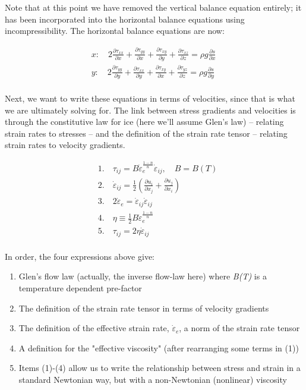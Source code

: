 Note that at this point we have removed the vertical balance equation entirely; it has been incorporated into the horizontal balance equations using incompressibility. The horizontal balance equations are now: 

\begin{align*}
  & x:\quad 2\frac{\partial \tau _{xx}}{\partial x}+\frac{\partial \tau _{yy}}{\partial x}+\frac{\partial \tau _{xy}}{\partial y}+\frac{\partial \tau _{xz}}{\partial z}=\rho g\frac{\partial s}{\partial x}\quad  \\ 
 & y:\quad 2\frac{\partial \tau _{yy}}{\partial y}+\frac{\partial \tau _{xx}}{\partial y}+\frac{\partial \tau _{xy}}{\partial x}+\frac{\partial \tau _{yz}}{\partial z}=\rho g\frac{\partial s}{\partial y} \\ 
\end{align*}

Next, we want to write these equations in terms of velocities, since that is what we are ultimately solving for. The link between stress gradients and velocities is through the constitutive law for ice (here we'll assume Glen's law) -- relating strain rates to stresses -- and the definition of the strain rate tensor -- relating strain rates to velocity gradients.

\begin{align*}
  & 1.\quad \tau _{ij}=B\dot{\varepsilon }_{e}^{\frac{1-n}{n}}\dot{\varepsilon }_{ij},\quad B=B(T) \\ 
 & 2.\quad \dot{\varepsilon }_{ij}=\frac{1}{2}\left( \frac{\partial u_{i}}{\partial x_{j}}+\frac{\partial u_{j}}{\partial x_{i}} \right) \\ 
 & 3.\quad 2\dot{\varepsilon }_{e}=\dot{\varepsilon }_{ij}\dot{\varepsilon }_{ij} \\ 
 & 4.\quad \eta \equiv \frac{1}{2}B\dot{\varepsilon }_{e}^{\frac{1-n}{n}} \\ 
 & 5.\quad \tau _{ij}=2\eta \dot{\varepsilon }_{ij} \\ 
\end{align*}

In order, the four expressions above give: 

\begin{enumerate}
\item  Glen's flow law (actually, the inverse flow-law here) where \textit{B(T)} is a temperature dependent pre-factor
\item  The definition of the strain rate tensor in terms of velocity gradients
\item  The definition of the effective strain rate, $\dot{\varepsilon }_{e}$, a norm of the strain rate tensor
\item  A definition for the "effective viscosity" (after rearranging some terms in (1))
\item  Items (1)-(4) allow us to write the relationship between stress and strain in a standard Newtonian way, but with a non-Newtonian (nonlinear) viscosity
\end{enumerate}

